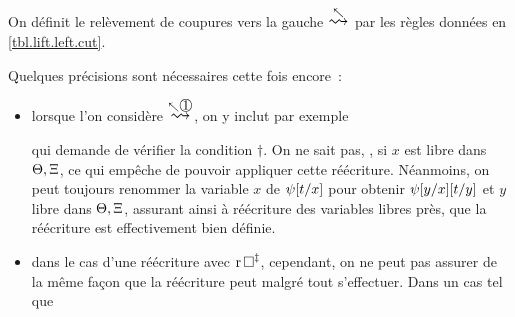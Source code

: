 \begin{definition}
  On définit le relèvement de coupures vers la gauche $\reecr{\nwarrow}$
  par les règles données en \cref{tbl.lift.left.cut}.
\end{definition}

\begin{remark}
  Quelques précisions sont nécessaires cette fois encore~:
  \begin{itemize}
  \item lorsque l'on considère $\reecr{\nwarrow \rOne}$, on y inclut
    par exemple
    \begin{center}
    \end{center}
    qui demande de vérifier la condition $\dagger$. On ne sait pas,
    , si $x$ est libre dans $\Theta,\Xi$, ce qui
    empêche de pouvoir appliquer cette réécriture. Néanmoins, on peut toujours
    renommer la variable $x$ de $\psi[t/x]$ pour obtenir $\psi[y/x][t/y]$
    et $y$ libre dans $\Theta,\Xi$, assurant ainsi à réécriture des variables
    libres près, que la réécriture est effectivement bien définie.
  \item dans le cas d'une réécriture avec $\Rrsq^\ddagger$, cependant, on
    ne peut pas assurer de la même façon que la réécriture peut malgré tout
    s'effectuer. Dans un cas tel que
    \begin{center}
      \resizebox{0.8\textwidth}{!}{
        \AxiomC{$\varPT$}
        \noLine
        \UnaryInfC{$\varCG,\varFF\vdLS\varFP,\varCD$}
        \RightLabel{$\Rrsq^\ddagger$}
        \UnaryInfC{$\varCG,\varFF\vdLS\modSq\varFP,\varCD$}
}
\end{center}
\end{itemize}
\end{remark}
